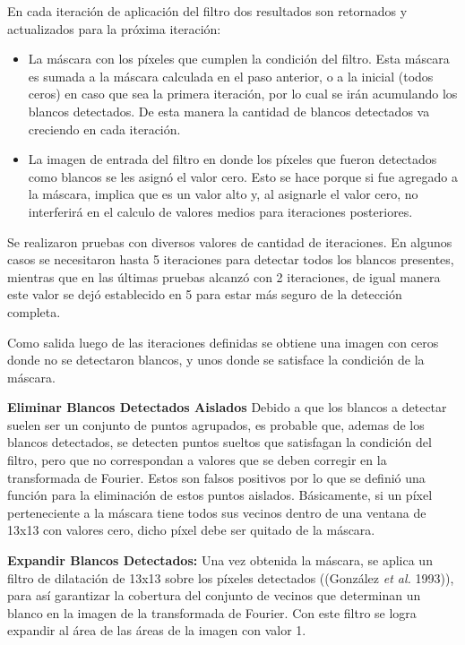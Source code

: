 \documentclass[10pt,a4paper, twoside]{report}
\begin{document}
En cada iteración de aplicación del filtro dos resultados son retornados y actualizados para la próxima iteración:

\begin{itemize}
\item La máscara con los píxeles que cumplen la condición del filtro. Esta máscara es sumada a la máscara calculada en el paso anterior, o a la inicial (todos ceros) en caso que sea la primera iteración, por lo cual se irán acumulando los blancos detectados. De esta manera la cantidad de blancos detectados va creciendo en cada iteración.
\item La imagen de entrada del filtro en donde los píxeles que fueron detectados como blancos se les asignó el valor cero.  Esto se hace porque si fue agregado a la máscara, implica que es un valor alto y, al asignarle el valor cero, no interferirá en el calculo de valores medios para iteraciones posteriores.
\end{itemize}

Se realizaron pruebas con diversos valores de cantidad de iteraciones. En algunos casos se necesitaron hasta 5 iteraciones para detectar todos los blancos presentes, mientras que en las últimas pruebas alcanzó con 2 iteraciones, de igual manera este valor se dejó establecido en 5 para estar más seguro de la detección completa.

Como salida luego de las iteraciones definidas se obtiene una imagen con ceros donde no se detectaron blancos, y unos donde se satisface la condición de la máscara.


\textbf{Eliminar Blancos Detectados Aislados} Debido a que los blancos a detectar suelen ser un conjunto de puntos agrupados, es probable que, ademas de los blancos detectados, se detecten puntos sueltos que satisfagan la condición del filtro, pero que no correspondan a valores que se deben corregir en la transformada de Fourier. Estos son falsos positivos por lo que se definió una función para la eliminación de estos puntos aislados. Básicamente, si un píxel perteneciente a la máscara tiene todos sus vecinos dentro de una ventana de 13x13 con valores cero, dicho píxel debe ser quitado de la máscara. 


\textbf{Expandir Blancos Detectados:} Una vez obtenida la máscara, se aplica un filtro de dilatación de 13x13 sobre los píxeles detectados ((González \textit{et al.} 1993)), para así garantizar la cobertura del conjunto de vecinos que determinan un blanco en la imagen de la transformada de Fourier. Con este filtro se logra expandir al área de las áreas de la imagen con valor 1.
\end{document}
